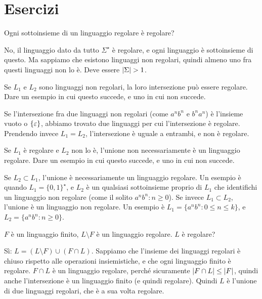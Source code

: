 
\chapter{Esercizi}

\begin{esercizio}
Ogni sottoinsieme di un linguaggio regolare \`e regolare?
\end{esercizio}

No, il linguaggio dato da tutto $\Sigma^{\star}$ \`e regolare, e ogni linguaggio \`e sottoinsieme di questo.
Ma sappiamo che esistono linguaggi non regolari, quindi almeno uno fra questi linguaggi non lo \`e.
Deve essere $\left\lvert{\Sigma}\right\rvert > 1$.

\begin{esercizio}
Se $L_1$ e $L_2$ sono linguaggi non regolari, la loro intersezione pu\`o essere regolare.
Dare un esempio in cui questo succede, e uno in cui non succede.
\end{esercizio}

Se l'intersezione fra due linguaggi non regolari (come $a^nb^n$ e $b^na^n$) \`e l'insieme vuoto o $\{\varepsilon\}$, abbiamo trovato due linguaggi per cui l'intersezione \`e regolare.
Prendendo invece $L_1 = L_2$, l'intersezione \`e uguale a entrambi, e non \`e regolare.

\begin{esercizio}
Se $L_1$ \`e regolare e $L_2$ non lo \`e, l'unione non necessariamente \`e un linguaggio regolare.
Dare un esempio in cui questo succede, e uno in cui non succede.
\end{esercizio}

Se $L_2 \subset L_1$, l'unione \`e necessariamente un linguaggio regolare.
Un esempio \`e quando $L_1 = \{0,1\}^{\star}$, e $L_2$ \`e un qualsiasi sottoinsieme proprio di $L_1$ che identifichi un linguaggio non regolare (come il solito $a^n b^n : n \ge 0$).
Se invece $L_1 \subset L_2$, l'unione \`e un linguaggio non regolare.
Un esempio \`e $L_1 = \{ a^n b^n : 0 \le n \le k \}$, e $L_2 = \{ a^n b^n : n \ge 0 \}$.

\begin{esercizio}
$F$ \`e un linguaggio finito, $L \setminus F$ \`e un linguaggio regolare. $L$ \`e regolare?
\end{esercizio}

S\`i: $L = (L \setminus F) \cup (F \cap L)$.
Sappiamo che l'insieme dei linguaggi regolari \`e chiuso rispetto alle operazioni insiemistiche, e che ogni linguaggio finito \`e regolare.
$F \cap L$ \`e un linguaggio regolare, perch\'e sicuramente $\left\lvert{F \cap L}\right\rvert \le \left\lvert{F}\right\rvert$,   quindi anche l'intersezione \`e un linguaggio finito (e quindi regolare).
Quindi $L$ \`e l'unione di due linguaggi regolari, che \`e a sua volta regolare.

